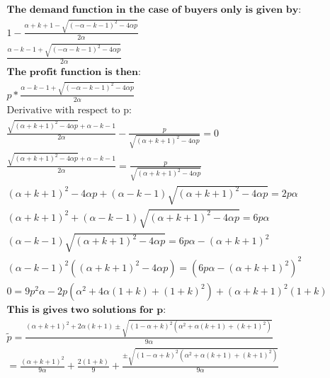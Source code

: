 \begin{align*}
\textbf{The demand function in the case of buyers only is given by:} \\
1-\frac{\alpha+k+1-\sqrt{(-\alpha-k-1)^2-4 \alpha p}}{2 \alpha} \\
\frac{\alpha-k-1+\sqrt{(-\alpha-k-1)^2-4 \alpha p}}{2 \alpha}
\\
\textbf{The profit function is then:} 
\\
p*\frac{\alpha-k-1+\sqrt{(-\alpha-k-1)^2-4 \alpha p}}{2 \alpha}
\\
\text{Derivative with respect to p}: \\
\frac{\sqrt{(\alpha+k+1)^2-4 \alpha p}+\alpha-k-1}{2 \alpha}-\frac{p}{\sqrt{(\alpha+k+1)^2-4 \alpha p}} =0
\\
\frac{\sqrt{(\alpha+k+1)^2-4 \alpha p}+\alpha-k-1}{2 \alpha} =\frac{p}{\sqrt{(\alpha+k+1)^2-4 \alpha p}} \\
( \alpha+k+1)^2-4 \alpha p+(\alpha-k-1)\sqrt{(\alpha+k+1)^2-4 \alpha p} = 2 p \alpha \\
( \alpha+k+1)^2+(\alpha-k-1)\sqrt{(\alpha+k+1)^2-4 \alpha p} = 6 p \alpha \\
(\alpha-k-1)\sqrt{(\alpha+k+1)^2-4 \alpha p} = 6 p \alpha - ( \alpha+k+1)^2 \\
(\alpha-k-1)^2((\alpha+k+1)^2-4 \alpha p) = (6 p \alpha - ( \alpha+k+1)^2 )^2
\\
0 = 9 p^2 \alpha  -2 p (\alpha^2 + 4\alpha(1+k)+(1+k)^2) + ( \alpha+k+1)^2 (1+k)
\\
\textbf{This is gives two solutions for p:} \\
\tilde{p} = \frac{(\alpha+k+1)^2+2\alpha(k+1) \pm \sqrt{(1-\alpha+k)^2(\alpha^2+\alpha (k+1)+(k+1)^2)}}{9 \alpha} \\
 = \frac{(\alpha+k+1)^2}{9 \alpha}+\frac{2(1+k)}{9}+\frac{ \pm \sqrt{(1-\alpha+k)^2(\alpha^2+\alpha (k+1)+(k+1)^2)}}{9 \alpha} \\
\end{align*}

